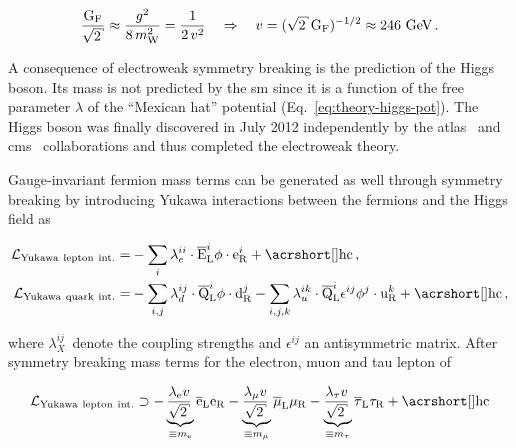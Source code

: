 \begin{equation}
\frac{\mathrm{G}_\mathrm{F}}{\sqrt{2}}\approx\frac{g^2}{8\,m_\mathrm{W}^{2}}=\frac{1}{2\,v^2}
\quad\Rightarrow\quad v=(\sqrt{2}\,\mathrm{G}_\mathrm{F})^{-1/2}\approx 246~\GeV\,.
\end{equation}
 
A consequence of electroweak symmetry breaking is the prediction of the Higgs boson. Its mass is not predicted by the \gls{sm} since it is a function of the free parameter $\lambda$ of the ``Mexican hat'' potential (Eq.~\ref{eq:theory-higgs-pot}). The Higgs boson was finally discovered in July 2012 independently by the \gls{atlas}~\cite{Aad:2012tfa} and \gls{cms}~\cite{Chatrchyan:2012xdj} collaborations and thus completed the electroweak theory. 


Gauge-invariant fermion mass terms can be generated as well through symmetry breaking by introducing Yukawa interactions between the fermions and the Higgs field as

\begin{subequations}
\begin{align}
\mathcal{L}_\mathrm{Yukawa~lepton~int.}=&-\sum_{i}\lambda_{e}^{ii}\cdot\bar{\mathrm{E}}^{i}_\mathrm{L}\phi\cdot\mathrm{e}^{i}_\mathrm{R}+\mathrm{\gls{hc}}\,, \label{eq:theory-lepton-yukawa}\\
\mathcal{L}_\mathrm{Yukawa~quark~int.}=&-\sum_{i,j}\lambda_{d}^{ij}\cdot\bar{\mathrm{Q}}^{i}_\mathrm{L}\phi\cdot\mathrm{d}^{j}_\mathrm{R}-\sum_{i,j,k}\lambda_{u}^{ik}\cdot\bar{\mathrm{Q}}^{i}_\mathrm{L}\epsilon^{ij}\phi^{j}\cdot\mathrm{u}^{k}_\mathrm{R} +\mathrm{\gls{hc}}\,, \label{eq:theory-quark-yukawa}
\end{align}
\end{subequations}

where $\lambda_{X}^{ij}\,$  denote the coupling strengths and $\epsilon^{ij}$ an antisymmetric matrix. After symmetry breaking mass terms for the electron, muon and tau lepton of 

\begin{equation}
\mathcal{L}_\mathrm{Yukawa~lepton~int.}\supset-\underbrace{\frac{\lambda_\mathrm{e} v}{\sqrt{2}}\,}_{\equiv m_\mathrm{e}}\bar{\mathrm{e}}_\mathrm{L}\mathrm{e}_\mathrm{R}-\underbrace{\frac{\lambda_{\mu} v}{\sqrt{2}}\,}_{\equiv m_{\mu}}\bar{\mu}_\mathrm{L}{\mu}_\mathrm{R}-\underbrace{\frac{\lambda_{\tau} v}{\sqrt{2}}\,}_{\equiv m_{\tau}}\bar{\tau}_\mathrm{L}{\tau}_\mathrm{R}+\mathrm{\gls{hc}}
\end{equation}

